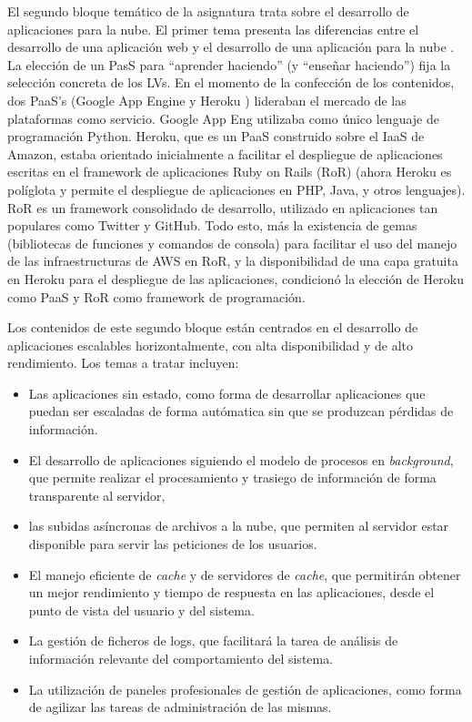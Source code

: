 \documentclass[conference]{IEEEtran}
\begin{document}
El segundo bloque temático de la asignatura trata sobre el desarrollo de aplicaciones para la
nube. El primer tema presenta las diferencias entre el desarrollo de una
aplicación web y el desarrollo de una aplicación para la nube
\cite{Heroku:2013,Wilder:2012}. La elección de un PasS para ``aprender
haciendo'' (y ``enseñar haciendo'') fija la selección concreta
de los LVs. En el momento de la confección de los contenidos, dos PaaS's
(Google App Engine \cite{Severance:2009} y Heroku \cite{Heroku:2013}) lideraban el mercado de las
plataformas como servicio. Google App Eng utilizaba como único lenguaje de
programación Python. Heroku, que es un PaaS construido sobre el IaaS de Amazon, estaba
orientado inicialmente a facilitar el despliegue de  aplicaciones escritas
en el framework de aplicaciones Ruby on Rails (RoR) \cite{Hartl:2012} (ahora
Heroku es políglota y permite el despliegue de aplicaciones en PHP, Java,
y otros lenguajes). RoR es un framework consolidado de desarrollo, utilizado 
en aplicaciones tan populares como Twitter y GitHub. Todo esto, más la existencia 
de gemas (bibliotecas de funciones y comandos de consola) para facilitar el uso del manejo de las infraestructuras de AWS en RoR, y la
disponibilidad de una capa gratuita en Heroku para el despliegue de las
aplicaciones, condicionó la elección de Heroku como PaaS y RoR como framework de
programación.

Los contenidos de este segundo bloque están centrados en el desarrollo de aplicaciones 
escalables horizontalmente, con alta disponibilidad y de alto rendimiento.
Los temas a tratar incluyen:
\begin{itemize}
\item Las aplicaciones sin estado, como forma de desarrollar aplicaciones que puedan ser
escaladas de forma autómatica sin que se produzcan pérdidas de información.
\item El desarrollo de aplicaciones siguiendo el modelo de procesos en \textit{background}, que permite
realizar el procesamiento y trasiego de información de forma transparente al servidor,
\item las subidas asíncronas de archivos a la nube, que permiten al servidor estar disponible para
servir las peticiones de los usuarios.
\item El manejo eficiente de \textit{cache} y  de servidores de \textit{cache}, que permitirán
obtener un mejor rendimiento y tiempo de respuesta en las aplicaciones, desde el punto de vista del
usuario y del sistema.
\item La gestión de ficheros de logs, que facilitará la tarea de análisis de información relevante
del comportamiento del sistema.
\item La utilización de paneles profesionales de gestión de aplicaciones, como forma de agilizar las
tareas de administración de las mismas.
\end{itemize}
 
\end{document}
